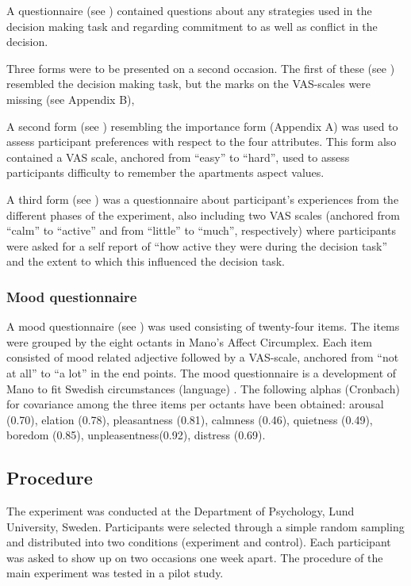 A questionnaire (see ) contained questions about any
strategies used in the decision making task and regarding commitment
to as well as conflict in the decision.

Three forms were to be presented on a second occasion.  The first of
these (see ) resembled the decision making task, but the
marks on the VAS-scales were missing (see Appendix B),

A second form (see ) resembling the importance form
(Appendix A) was used to assess participant preferences with respect
to the four attributes.  This form also contained a VAS scale,
anchored from ``easy'' to ``hard'', used to assess participants difficulty
to remember the apartments aspect values.

A third form (see ) was a questionnaire about participant's
experiences from the different phases of the experiment, also
including two VAS scales (anchored from ``calm'' to ``active'' and from
``little'' to ``much'', respectively) where participants were asked for a
self report of ``how active they were during the decision task'' and the
extent to which this influenced the decision task.


\subsubsection{Mood questionnaire} 
A mood questionnaire (see ) was used
consisting of twenty-four items.  The items were grouped by the eight
octants in Mano's Affect Circumplex.  Each item consisted of mood
related adjective followed by a VAS-scale, anchored from ``not at all''
to ``a lot'' in the end points.  The mood questionnaire is a development
of Mano \parencite{LewinsohnMano93} to fit Swedish circumstances
(language) \parencite{Salo96}.  The following alphas (Cronbach) for
covariance among the three items per octants have been obtained:
arousal (0.70), elation (0.78), pleasantness (0.81), calmness (0.46),
quietness (0.49), boredom (0.85), unpleasentness(0.92), distress
(0.69).


\subsection{Procedure}

The experiment was conducted at the Department of Psychology, Lund
University, Sweden.  Participants were selected through a simple
random sampling and distributed into two conditions (experiment and
control).  Each participant was asked to show up on two occasions one
week apart.  The procedure of the main experiment was tested in a
pilot study.


